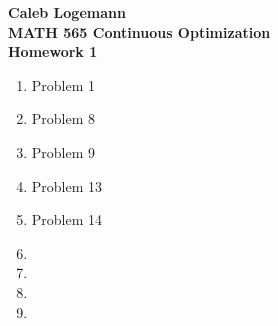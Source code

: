 \documentclass[11pt, oneside]{article}
\begin{document}
\noindent \textbf{\Large{Caleb Logemann \\
MATH 565 Continuous Optimization \\
Homework 1
}}

\begin{enumerate}
  \item %
    Problem 1

  \item %
    Problem 8

  \item %
    Problem 9

  \item %
    Problem 13

  \item %
    Problem 14

  \item %

  \item %

  \item %

  \item %

\end{enumerate}
\end{document}
